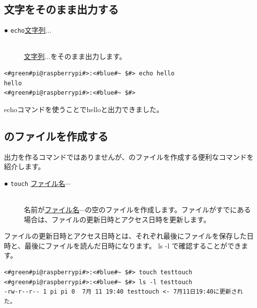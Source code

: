 \documentclass[text03.tex]{subfiles}
\begin{document}
\subsection{文字をそのまま出力する}
\begin{description}
    \item[● \texttt{echo}\textvisiblespace \underline{文字列}$\ldots$]\mbox{}\\
    \underline{文字列}$\ldots$をそのまま出力します。
    \label{cmd:echo}
\end{description}

\begin{lstlisting}[caption=echoコマンド]
<#green#pi@raspberrypi#>:<#blue#~ $#> echo hello
hello
<#green#pi@raspberrypi#>:<#blue#~ $#>
\end{lstlisting}
echoコマンドを使うことでhelloと出力できました。


\subsection{のファイルを作成する}
出力を作るコマンドではありませんが、のファイルを作成する便利なコマンドを紹介します。

\begin{description}
    \item[● \texttt{touch} \underline{ファイル名}$\cdots$]\mbox{}\\
    名前が\underline{ファイル名}$\cdots$の空のファイルを作成します。ファイルがすでにある場合は、ファイルの更新日時とアクセス日時を更新します。
\end{description}

ファイルの更新日時とアクセス日時とは、それぞれ最後にファイルを保存した日時と、最後にファイルを読んだ日時になります。 ls -l で確認することができます。
\begin{lstlisting}[caption=空のファイルを作成, label=cmd:touch]
<#green#pi@raspberrypi#>:<#blue#~ $#> touch testtouch
<#green#pi@raspberrypi#>:<#blue#~ $#> ls -l testtouch
-rw-r--r-- 1 pi pi 0  7月 11 19:40 testtouch <- 7月11日19:40に更新された。
\end{lstlisting}

\begin{tcolorbox}[title=\useOmetoi]
    \begin{enumerate}
    \end{enumerate}
\end{tcolorbox}
\end{document}
